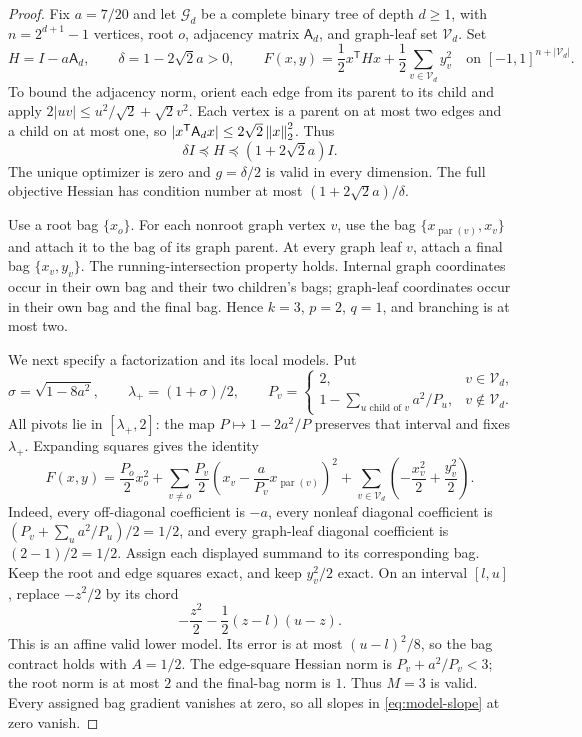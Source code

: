 \begin{proof}
Fix $a=7/20$ and let $\mathcal G_d$ be a complete binary tree of depth
$d\ge1$, with $n=2^{d+1}-1$ vertices, root $o$, adjacency matrix
$\mathsf A_d$, and graph-leaf set $\mathcal V_d$. Set
\[
 H=I-a\mathsf A_d,\qquad \delta=1-2\sqrt2a>0,
 \qquad
 F(x,y)=\frac12x^{\mathsf T}Hx+
              \frac12\sum_{v\in\mathcal V_d}y_v^2
 \quad\text{on }[-1,1]^{n+|\mathcal V_d|}.
\]
To bound the adjacency norm, orient each edge from its parent to its
child and apply
$2|uv|\le u^2/\sqrt2+\sqrt2v^2$.
Each vertex is a parent on at most two edges and a child on at most one,
so $|x^{\mathsf T}\mathsf A_dx|\le2\sqrt2\left\lVert x\right\rVert_2^2$. Thus
\begin{equation}\label{eq:limitations-spectrum}
 \delta I\preceq H\preceq(1+2\sqrt2a)I.
\end{equation}
The unique optimizer is zero and $g=\delta/2$ is valid in every
dimension. The full objective Hessian has condition number at most
$(1+2\sqrt2a)/\delta$.

Use a root bag $\{x_o\}$. For each nonroot graph vertex $v$, use the
bag $\{x_{\operatorname{par}(v)},x_v\}$ and attach it to the bag of its
graph parent. At every graph leaf $v$, attach a final bag $\{x_v,y_v\}$.
The running-intersection property holds. Internal graph coordinates
occur in their own bag and their two children's bags; graph-leaf
coordinates occur in their own bag and the final bag. Hence $k=3$,
$p=2$, $q=1$, and branching is at most two.

We next specify a factorization and its local models. Put
\[
 \sigma=\sqrt{1-8a^2},\qquad \lambda_+=(1+\sigma)/2,
 \qquad
 P_v=\begin{cases}
  2,&v\in\mathcal V_d,\\
  1-\displaystyle\sum_{u\text{ child of }v}a^2/P_u,&v\notin\mathcal V_d.
 \end{cases}
\]
All pivots lie in $[\lambda_+,2]$: the map
$P\mapsto1-2a^2/P$ preserves that interval and fixes $\lambda_+$.
Expanding squares gives the identity
\begin{equation}\label{eq:limitations-factorization}
 F(x,y)=\frac{P_o}2x_o^2+
 \sum_{v\ne o}\frac{P_v}2
       \left(x_v-\frac a{P_v}x_{\operatorname{par}(v)}\right)^2
 +\sum_{v\in\mathcal V_d}\left(-\frac{x_v^2}2+\frac{y_v^2}2\right).
\end{equation}
Indeed, every off-diagonal coefficient is $-a$, every nonleaf diagonal
coefficient is $(P_v+\sum_ua^2/P_u)/2=1/2$, and every graph-leaf
diagonal coefficient is $(2-1)/2=1/2$.
Assign each displayed summand to its corresponding bag. Keep the root
and edge squares exact, and keep $y_v^2/2$ exact. On an interval $[l,u]$,
replace $-z^2/2$ by its chord
\[
 -\frac{z^2}2-\frac12(z-l)(u-z).
\]
This is an affine valid lower model. Its error is at most
$(u-l)^2/8$, so the bag contract holds with $A=1/2$. The edge-square
Hessian norm is $P_v+a^2/P_v<3$; the root norm is at most $2$ and the
final-bag norm is $1$. Thus $M=3$ is valid. Every assigned bag gradient
vanishes at zero, so all slopes in \cref{eq:model-slope} at zero vanish.


\end{proof}
